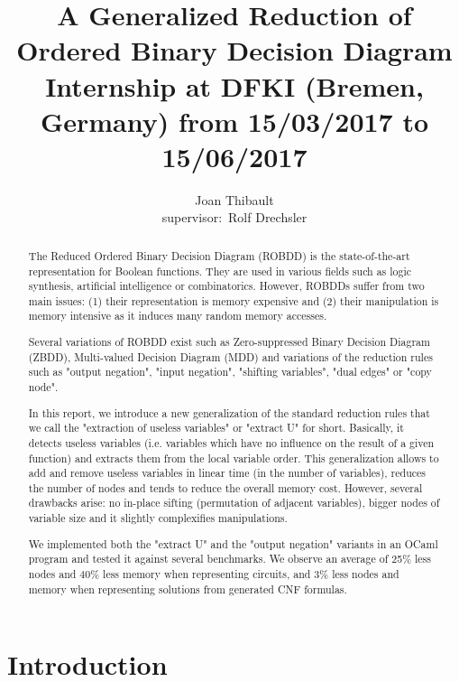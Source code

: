 \documentclass[a4paper,10pt]{article}
\title{A Generalized Reduction of Ordered Binary Decision Diagram\\{\small Internship at DFKI (Bremen, Germany) from 15/03/2017 to 15/06/2017}}
\author{Joan Thibault\\supervisor:~Rolf Drechsler}
\begin{document}
\maketitle
\begin{abstract}
The Reduced Ordered Binary Decision Diagram (ROBDD)\cite{Bryant1986, Somenzi1999} is the state-of-the-art representation for Boolean functions.
They are used in various fields such as logic synthesis, artificial intelligence or combinatorics.
However, ROBDDs suffer from two main issues: (1) their representation is memory expensive and (2) their manipulation is memory intensive as it induces many random memory accesses.


Several variations of ROBDD exist such as Zero-suppressed Binary Decision Diagram (ZBDD)\cite{IntroZDD}, Multi-valued Decision Diagram (MDD)\cite{IntroMDD, IntroMddRolf} and variations of the reduction rules such as "output negation"\cite{BryantVariantN}, "input negation"\cite{MinatoVariants}, "shifting variables"\cite{MinatoVariants}, "dual edges"\cite{RolfVariantDual} or "copy node"\cite{RolfVariantCopy}.


In this report, we introduce a new generalization of the standard reduction rules that we call the "extraction of useless variables" or "extract U" for short.
Basically, it detects useless variables (i.e. variables which have no influence on the result of a given function) and extracts them from the local variable order.
This generalization allows to add and remove useless variables in linear time (in the number of variables), reduces the number of nodes and tends to reduce the overall memory cost.
However, several drawbacks arise: no in-place sifting (permutation of adjacent variables), bigger nodes of variable size and it slightly complexifies manipulations.


We implemented both the "extract U" and the "output negation" variants in an OCaml program and tested it against several benchmarks\cite{BenchSatlib, BenchLgsynth91, BenchIscas99}.
We observe an average of 25\% less nodes and 40\% less memory when representing circuits, and 3\% less nodes and memory when representing solutions from generated CNF formulas.
\end{abstract}

\newpage



\section{Introduction}
\end{document}
